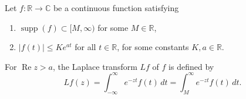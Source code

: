 Let $f \colon \mathbb{R} \to \mathbb{C}$ be a continuous function satisfying
\begin{enumerate}
\item $\operatorname{supp}(f) \subset [M, \infty)$ for some $M \in \mathbb{R}$,
\item $|f(t)| \leq K e^{at}$ for all $t \in \mathbb{R}$, for some constants $K, a \in \mathbb{R}$.
\end{enumerate}
For $\operatorname{Re} z > a$, the Laplace transform $Lf$ of $f$ is defined by
$$Lf(z) = \int_{-\infty}^{\infty} e^{-zt} f(t) \, dt = \int_{M}^{\infty} e^{-zt} f(t) \, dt.$$
